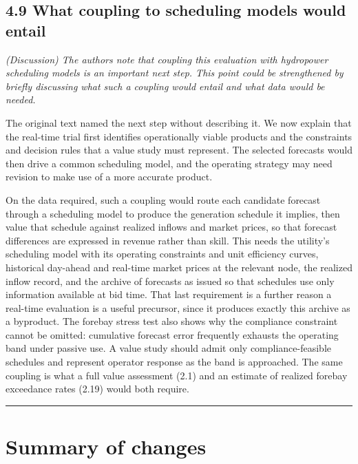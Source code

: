 \documentclass[11pt]{article}
\newenvironment{rc}%
  {\begin{list}{}{\setlength{\leftmargin}{1.5em}\setlength{\rightmargin}{1.5em}%
   \setlength{\topsep}{0.2em}\setlength{\parsep}{0pt}\setlength{\itemsep}{0pt}}%
   \item[]\itshape\color{quotegray}}%
  {\end{list}}
\begin{document}
\subsection*{4.9 What coupling to scheduling models would entail}

\begin{rc}
(Discussion) The authors note that coupling this evaluation with hydropower scheduling models is an
important next step. This point could be strengthened by briefly discussing what such a coupling
would entail and what data would be needed.
\end{rc}

The original text named the next step without describing it. We now explain that the real-time
trial first identifies operationally viable products and the constraints and decision rules that a
value study must represent. The selected forecasts would then drive a common scheduling model, and
the operating strategy may need revision to make use of a more accurate product.

On the data required, such a coupling would route each candidate forecast through a scheduling model to
produce the generation schedule it implies, then value that schedule against realized inflows and
market prices, so that forecast differences are expressed in revenue rather than skill. This needs the
utility's scheduling model with its operating constraints and unit efficiency curves, historical
day-ahead and real-time market prices at the relevant node, the realized inflow record, and the archive
of forecasts as issued so that schedules use only information available at bid time. That last
requirement is a further reason a real-time evaluation is a useful precursor, since it produces exactly
this archive as a byproduct. The forebay stress test also shows why the compliance constraint cannot
be omitted: cumulative forecast error frequently exhausts the operating band under passive use. A
value study should admit only compliance-feasible schedules and represent operator response as the
band is approached. The same coupling is what a full value assessment (2.1) and an estimate of
realized forebay exceedance rates (2.19) would both require.

\vspace{0.4em}
\hrule
\vspace{0.4em}

\section*{Summary of changes}
\end{document}
